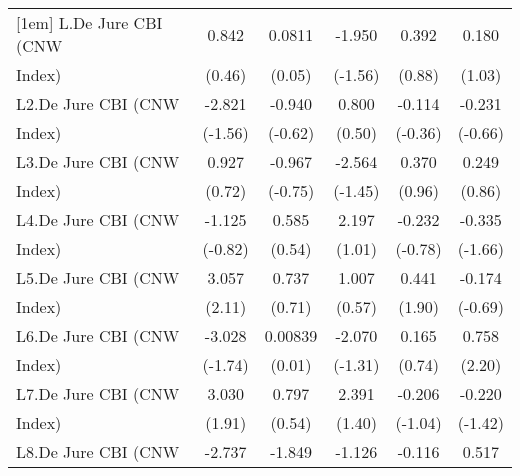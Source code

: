 {\begin{tabular}{l*{5}{c}}
[1em]
L.De Jure CBI (CNW  &       0.842         &      0.0811         &      -1.950         &       0.392         &       0.180         \\
Index)              &      (0.46)         &      (0.05)         &     (-1.56)         &      (0.88)         &      (1.03)         \\
[1em]
L2.De Jure CBI (CNW &      -2.821         &      -0.940         &       0.800         &      -0.114         &      -0.231         \\
Index)              &     (-1.56)         &     (-0.62)         &      (0.50)         &     (-0.36)         &     (-0.66)         \\
[1em]
L3.De Jure CBI (CNW &       0.927         &      -0.967         &      -2.564         &       0.370         &       0.249         \\
Index)              &      (0.72)         &     (-0.75)         &     (-1.45)         &      (0.96)         &      (0.86)         \\
[1em]
L4.De Jure CBI (CNW &      -1.125         &       0.585         &       2.197         &      -0.232         &      -0.335         \\
Index)              &     (-0.82)         &      (0.54)         &      (1.01)         &     (-0.78)         &     (-1.66)         \\
[1em]
L5.De Jure CBI (CNW &       3.057\sym{*}  &       0.737         &       1.007         &       0.441         &      -0.174         \\
Index)              &      (2.11)         &      (0.71)         &      (0.57)         &      (1.90)         &     (-0.69)         \\
[1em]
L6.De Jure CBI (CNW &      -3.028         &     0.00839         &      -2.070         &       0.165         &       0.758\sym{*}  \\
Index)              &     (-1.74)         &      (0.01)         &     (-1.31)         &      (0.74)         &      (2.20)         \\
[1em]
L7.De Jure CBI (CNW &       3.030         &       0.797         &       2.391         &      -0.206         &      -0.220         \\
Index)              &      (1.91)         &      (0.54)         &      (1.40)         &     (-1.04)         &     (-1.42)         \\
[1em]
L8.De Jure CBI (CNW &      -2.737         &      -1.849         &      -1.126         &      -0.116         &       0.517         \\

\end{tabular}}
